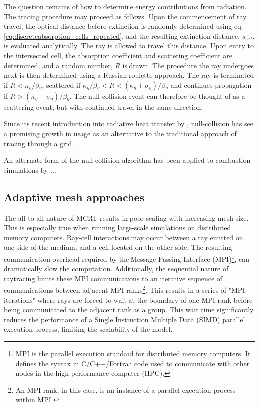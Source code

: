 The question remains of how to determine energy contributions from radiation. 
The tracing procedure may proceed as follows. Upon the commencement of ray travel, the optical distance before extinction is randomly determined using eq. \ref{eq:discreteabsorption_cells_repeated}, and the resulting extinction distance, $s_{ext}$, is evaluated analytically.
The ray is allowed to travel this distance. Upon entry to the intersected cell, the absorption coefficient and scattering coefficient are determined, and a random number, $R$ is drawn.
The procedure the ray undergoes next is then determined using a Russian-roulette approach.
The ray is terminated if $R<\kappa{}_\eta{}/\beta{}_\eta{}$, scattered if $\kappa{}_\eta{}/\beta{}_\eta{}<R<(\kappa{}_\eta{}+\sigma{}_\eta{})/\beta{}_\eta{}$ and continues propagation if $R>(\kappa{}_\eta{}+\sigma{}_\eta{})/\beta{}_\eta{}$. 
The null collision event can therefore be thought of as a scattering event, but with continued travel in the same direction.

Since its recent introduction into radiative heat transfer by \citet{Galtier2013IntegralAlgorithms}, null-collision has see a promising growth in usage as an alternative to the traditional approach of tracing through a grid.

An alternate form of the null-collision algorithm has been applied to combustion simulations by \citet{Eymet2013Null-collisionSimulators}...


\subsection{Adaptive mesh approaches}
The all-to-all nature of MCRT results in poor scaling with increasing mesh size. 
This is especially true when running large-scale simulations on distributed memory computers.
Ray-cell interactions may occur between a ray emitted on one side of the medium, and a cell located on the other side.
The resulting communication overhead required by the Message Passing Interface (MPI)\footnote{MPI is the parallel execution standard for distributed memory computers. It defines the syntax in C/C++/Fortran code used to communicate with other nodes in the high performance computer (HPC).}, can dramatically slow the computation. Additionally, the sequential nature of raytracing limits these MPI communications to an iterative sequence of communications between adjacent MPI ranks\footnote{An MPI rank, in this case, is an instance of a parallel execution process within MPI.}.
This results in a series of "MPI iterations" where rays are forced to wait at the boundary of one MPI rank before being communicated to the adjacent rank as a group. This wait time significantly reduces the performance of a Single Instruction Multiple Data (SIMD) parallel execution process, limiting the scalability of the model.

